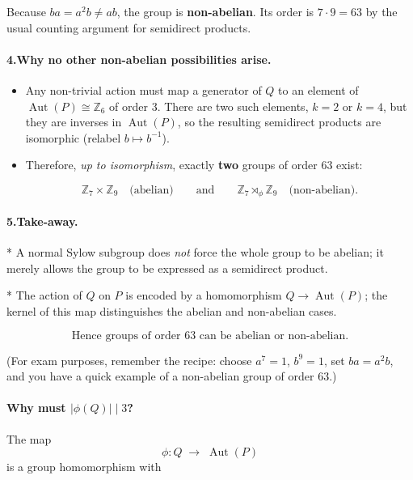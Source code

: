 \documentclass[12pt]{article}
\DeclareMathOperator{\Aut}{Aut}
\theoremstyle{definition} %
\theoremstyle{plain} %
\begin{document}
Because $ba=a^{2}b\neq ab$, the group is \textbf{non-abelian}.  
Its order is $7\cdot9=63$ by the usual counting argument for semidirect
products.

\bigskip
\paragraph{\textbf{4.\;Why no other non-abelian possibilities arise.}}

\begin{itemize}
\item Any non-trivial action must map a generator of $Q$ to an element of
      $\Aut(P)\cong\mathbb{Z}_{6}$ of order $3$.
      There are two such elements, $k=2$ or $k=4$, but they are inverses
      in $\Aut(P)$, so the resulting semidirect products are isomorphic
      (relabel $b\mapsto b^{-1}$).

\item Therefore, \emph{up to isomorphism}, exactly \textbf{two} groups of
      order $63$ exist:

      \[
        \boxed{\mathbb{Z}_{7}\times\mathbb{Z}_{9}\quad\text{(abelian)}}
        \qquad\text{and}\qquad
        \boxed{\mathbb{Z}_{7}\rtimes_{\phi}\mathbb{Z}_{9}\quad\text{(non-abelian)}}.
      \]
\end{itemize}

\bigskip
\paragraph{\textbf{5.\;Take-away.}}

* A normal Sylow subgroup does \emph{not} force the whole group to be abelian;  
  it merely allows the group to be expressed as a semidirect product.

* The action of $Q$ on $P$ is encoded by a homomorphism
  $Q\to\Aut(P)$; the kernel of this map distinguishes the abelian and
  non-abelian cases.

\[
\boxed{\text{Hence groups of order }63\text{ can be abelian or non-abelian.}}
\]

\noindent
(For exam purposes, remember the recipe:  
choose $a^{7}=1$, $b^{9}=1$, set $ba=a^{2}b$, and you have a quick example
of a non-abelian group of order $63$.)
\paragraph{Why must \(\lvert\phi(Q)\rvert\mid 3\)?}
The map
\[
     \phi : Q \;\longrightarrow\; \Aut(P)
\]
is a group homomorphism with  
\end{document}
